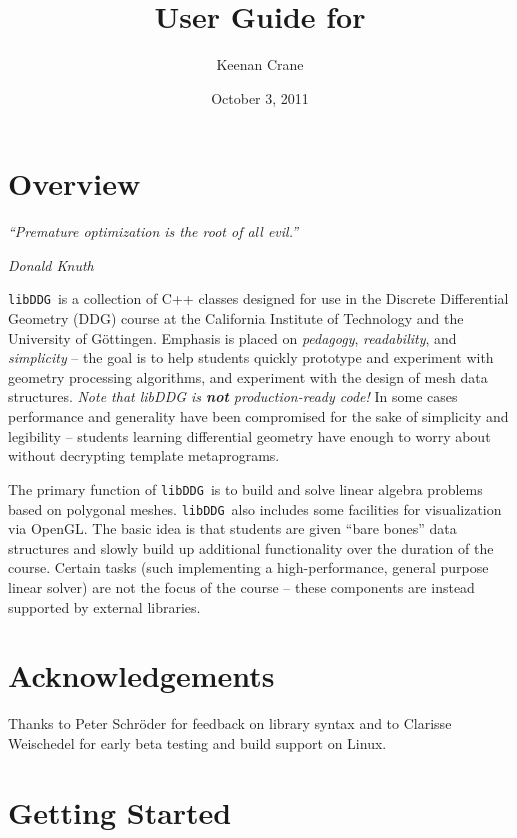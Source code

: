 \documentclass{article}
\title{User Guide for \libddg}
\author{Keenan Crane}
\date{October 3, 2011}
\newcommand{\libddg}{\texttt{libDDG}\ }
\begin{document}
\maketitle

\pagebreak

\tableofcontents

\addtolength{\parskip}{\baselineskip}

\pagebreak
\section{Overview}

\epigraph{\textit{``Premature optimization is the root of all evil.''}}{\textit{Donald Knuth}}

\libddg is a collection of C++ classes designed for use in the Discrete Differential Geometry (DDG) course at the California Institute of Technology and the University of G\"{o}ttingen.  Emphasis is placed on \emph{pedagogy}, \emph{readability}, and \emph{simplicity} -- the goal is to help students quickly prototype and experiment with geometry processing algorithms, and experiment with the design of mesh data structures.  \emph{Note that libDDG is \textbf{not} production-ready code!}  In some cases performance and generality have been compromised for the sake of simplicity and legibility -- students learning differential geometry have enough to worry about without decrypting template metaprograms.

The primary function of \libddg is to build and solve linear algebra problems based on polygonal meshes.  \libddg also includes some facilities for visualization via OpenGL.  The basic idea is that students are given ``bare bones'' data structures and slowly build up additional functionality over the duration of the course.  Certain tasks (such implementing a high-performance, general purpose linear solver) are not the focus of the course -- these components are instead supported by external libraries.

\pagebreak
\section{Acknowledgements}

Thanks to Peter Schr\"{o}der for feedback on library syntax and to Clarisse Weischedel for early beta testing and build support on Linux.

\pagebreak
\section{Getting Started}
\end{document}
